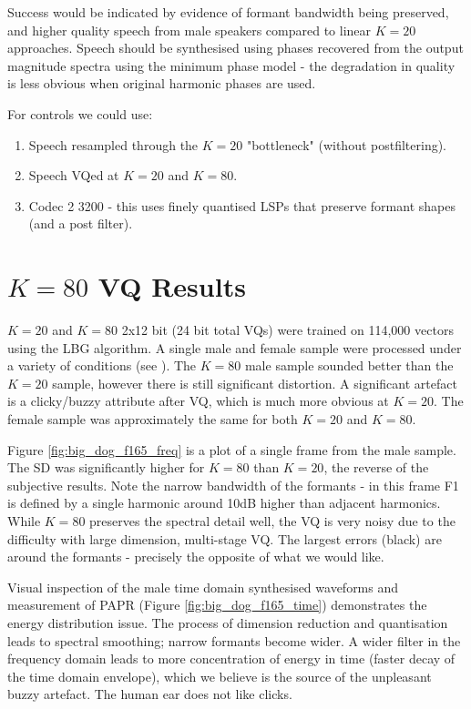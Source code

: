 \documentclass{article}
\begin{document}
Success would be indicated by evidence of formant bandwidth being preserved, and higher quality speech from male speakers compared to linear $K=20$ approaches. Speech should be synthesised using phases recovered from the output magnitude spectra using the minimum phase model - the degradation in quality is less obvious when original harmonic phases are used. 

For controls we could use:
\begin{enumerate}
\item Speech resampled through the $K=20$ "bottleneck" (without postfiltering).
\item Speech VQed at $K=20$ and $K=80$. 
\item Codec 2 3200 - this uses finely quantised LSPs that preserve formant shapes (and a post filter). 
\end{enumerate}

\section{$K=80$ VQ Results}

$K=20$ and $K=80$ 2x12 bit (24 bit total VQs) were trained on 114,000 vectors using the LBG algorithm.  A single male and female sample were processed under a variety of conditions (see ).  The $K=80$ male sample sounded better than the $K=20$ sample, however there is still significant distortion.  A significant artefact is a clicky/buzzy attribute after VQ, which is much more obvious at $K=20$. The female sample was approximately the same for both $K=20$ and $K=80$.

Figure \ref{fig:big_dog_f165_freq} is a plot of a single frame from the male sample.  The SD was significantly higher for $K=80$ than $K=20$, the reverse of the subjective results.  Note the narrow bandwidth of the formants - in this frame F1 is defined by a single harmonic around 10dB higher than adjacent harmonics.  While $K=80$ preserves the spectral detail well, the VQ is very noisy due to the difficulty with large dimension, multi-stage VQ. The largest errors (black) are around the formants - precisely the opposite of what we would like.

Visual inspection of the male time domain synthesised waveforms and measurement of PAPR (Figure \ref{fig:big_dog_f165_time}) demonstrates the energy distribution issue. The process of dimension reduction and quantisation leads to spectral smoothing; narrow formants become wider.  A wider filter in the frequency domain leads to more concentration of energy in time (faster decay of the time domain envelope), which we believe is the source of the unpleasant buzzy artefact.  The human ear does not like clicks.
\end{document}
